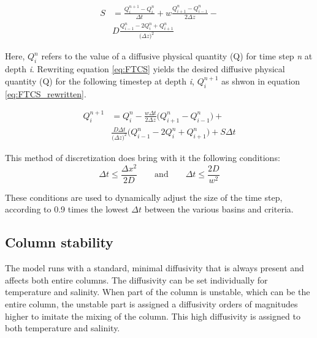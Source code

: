 \documentclass[twocolumn]{article}
\begin{document}
\begin{equation}
\begin{split}
    S& =\frac{Q^{n+1}_i-Q^n_i}{\Delta t} + w\frac{ Q^n_{i+1}-Q^n_{i-1}}{2 \Delta z} -\\
		&D\frac{Q^n_{i-1} -2Q^n_{i}+Q^n_{i+1}}{\big( \Delta z \big)^2} 
\end{split}
\label{eq:FTCS}
\end{equation}

\noindent Here, $Q^n_i$ refers to the value of a diffusive physical quantity (Q) for time step \textit{n} at depth \textit{i}. Rewriting equation \ref{eq:FTCS} yields the desired diffusive physical quantity (Q) for the following timestep at depth \textit{i}, $Q^{n+1}_i$ as shwon in equation \ref{eq:FTCS_rewritten}.

\begin{equation}
\begin{split}
    Q^{n+1}_i& = Q^n_i-\frac{w \Delta t}{2 \Delta z} \Big( Q^n_{i+1}-Q^n_{i-1} \Big) + \\
		&\frac{D \Delta t}{\big( \Delta z \big)^2} \Big( Q^n_{i-1}-2Q^n_{i}+Q^n_{i+1} \Big) + S \Delta t
\end{split}
\label{eq:FTCS_rewritten}
\end{equation}

\noindent This method of discretization does bring with it the following conditions:
\begin{equation}
    \Delta t \leq \frac{\Delta x^2}{2D} \qquad \text{and} \qquad \Delta t \leq \frac{2D}{w^2}
\label{eq:FCTS_limits}
\end{equation}

\noindent These conditions are used to dynamically adjust the size of the time step, according to 0.9 times the lowest $\Delta t$ between the various basins and criteria.


\subsection{Column stability}
\label{sect:stability_methods}
The model runs with a standard, minimal diffusivity that is always present and affects both entire columns. The diffusivity can be set individually for temperature and salinity. When part of the column is unstable, which can be the entire column, the unstable part is assigned a diffusivity orders of magnitudes higher to imitate the mixing of the column. This high diffusivity is assigned to both temperature and salinity.
\end{document}
